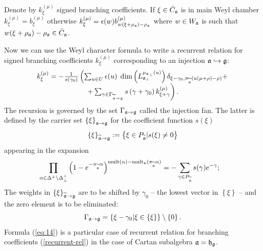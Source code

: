 Denote by  $k_{\xi }^{\left( \mu \right) }$ signed branching coefficients. If $\xi\in \bar C_{\mathfrak{a}}$ is in main Weyl chamber $k_{\xi}^{(\mu)}=b^{(\mu)}_{\xi}$ otherwise $k_{\xi}^{(\mu)}=\epsilon(w) b^{(\mu)}_{w (\xi+\rho_{\mathfrak{a}})-\rho_{\mathfrak{a}}}$ where $w\in W_{\mathfrak{a}}$ is such that $w (\xi+\rho_{\mathfrak{a}})-\rho_{\mathfrak{a}}\in \bar C_{\mathfrak{a}}$. 

Now we can use the Weyl character formula to write a
recurrent relation \cite{2010arXiv1007.0318L} for signed branching
coefficients $k_{\xi }^{\left( \mu \right) }$ corresponding to an
injection $\mathfrak{a}\hookrightarrow \mathfrak{g}$:
\begin{equation}
\begin{array}{c}
k_{\xi }^{\left( \mu \right) }=-\frac{1}{s\left( \gamma _{0}\right) }\left(
\sum_{u\in U}\epsilon (u)\;\dim \left( L_{\afb}^{\mu _{\af%
_{\perp }}\left( u\right) }\right) \delta _{\xi -\gamma _{0},\pi _{%
\widetilde{\af}}(u(\mu +\rho )-\rho )}+\right.  \\
\left. +\sum_{\gamma \in \Gamma _{\widetilde{\af}\rightarrow \gf%
}}s\left( \gamma +\gamma _{0}\right) k_{\xi +\gamma }^{\left( \mu \right)
}\right) .
\end{array}
\label{recurrent-rel}
\end{equation}
The recursion is governed by the set $\Gamma _{\mathfrak{a}\rightarrow \mathfrak{g}}$ called the injection fan. The latter is defined by the
carrier set $\left\{ \xi \right\} _{\mathfrak{a}\rightarrow \mathfrak{g}}$ for the
coefficient function $s(\xi )$
\begin{equation*}
\left\{ \xi \right\} _{\widetilde{\mathfrak{a}}\rightarrow \mathfrak{g}}:=\left\{
\xi \in P_{\widetilde{\mathfrak{a}}}|s(\xi )\neq 0\right\}
\end{equation*}
appearing in the expansion
\begin{equation}
\prod_{\alpha \in \Delta ^{+}\setminus \Delta _{\bot }^{+}}\left( 1-e^{-\pi
_{\widetilde{\af}}\alpha }\right) ^{\mathrm{mult}(\alpha )-\mathrm{mult}%
_{\af}(\pi _{\widetilde{\af}}\alpha )}=-\sum_{\gamma \in P_{%
\widetilde{\af}}}s(\gamma )e^{-\gamma };\quad
\end{equation}
The weights in $\left\{ \xi \right\} _{\widetilde{\mathfrak{a}}\rightarrow \mathfrak{g}}$ are to be shifted by $\gamma _{0}$ -- the lowest vector in $\left\{ \xi
\right\} $ -- and the zero element is to be eliminated:
\begin{equation}
\Gamma _{\mathfrak{a}\rightarrow \mathfrak{g}}=\left\{ \xi -\gamma
_{0}|\xi \in \left\{ \xi \right\} \right\} \setminus \left\{ 0\right\} .
\end{equation}
Formula (\ref{eq:14}) is a particular case of recurrent relation for branching coefficients (\ref{recurrent-rel}) in the case of Cartan subalgebra $\mathfrak{a}=\mathfrak{h}_{\mathfrak{g}}$.

